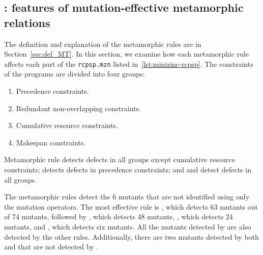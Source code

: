 \subsection{\rqidentifying: features of mutation-effective metamorphic relations}
The definition and explanation of the metamorphic rules are in
Section~\ref{sec:def_MT}. In this section, we examine how each
metamorphic rule affects each part of the \lstinline|rcpsp.mzn| listed
in~\ref{lst:minizinc-rcpsp}. The constraints of the programs are
divided into four groups:

\begin{enumerate}
\item\label{item:precdence} Precedence constraints.
\item\label{item:redundant} Redundant non-overlapping constraints.
\item\label{item:cumulative} Cumulative resource constraints.
\item\label{item:makespan} Makespan constraints.
\end{enumerate}

Metamorphic rule  detects defects in all groups except
cumulative resource constraints;  detects defects in precedence
constraints; and  and  detect defects in all groups.

The metamorphic rules detect the 6 mutants that are not identified
using only the mutation operators. The most effective rule is ,
which detects 63 mutants out of 74 mutants,
followed by , which detects 48
mutants, , which detects 24 mutants, and , which detects
six mutants. All the mutants detected by  are also detected by
the other rules. Additionally, there are two mutants detected by both 
and  that are not detected by .
